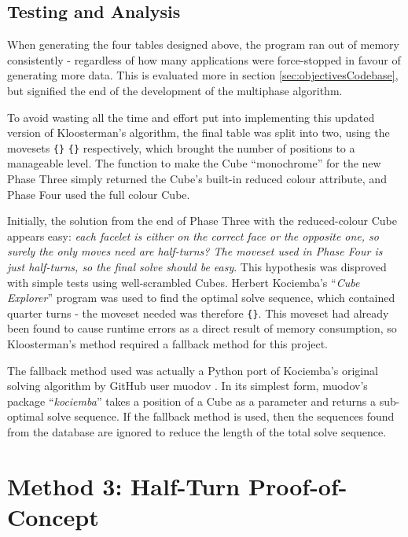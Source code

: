 \documentclass{report}
\newcommand{\tit}[1]{\textit{#1}}
\newcommand{\propernoun}[1]{\enquote{\tit{#1}}}
\newcommand{\moveset}[1]{\uppercase{\texttt{\{\formatmoves{#1}\}}}}
\begin{document}
	\subsection{Testing and Analysis}
	
	When generating the four tables designed above, the program ran out of memory consistently - regardless of how many applications were force-stopped in favour of generating more data. This is evaluated more in section \ref{sec:objectivesCodebase}, but signified the end of the development of the multiphase algorithm.
		
	To avoid wasting all the time and effort put into implementing this updated version of Kloosterman's algorithm, the final table was split into two, using the movesets \moveset{u'd'l2r2f2b"} \moveset{u2d2l2r2f2b"} respectively, which brought the number of positions to a manageable level. The function to make the Cube \enquote{monochrome} for the new Phase Three simply returned the Cube's built-in reduced colour attribute, and Phase Four used the full colour Cube.
	
	Initially, the solution from the end of Phase Three with the reduced-colour Cube appears easy: \tit{each facelet is either on the correct face or the opposite one, so surely the only moves need are half-turns? The moveset used in Phase Four is just half-turns, so the final solve should be easy}. This hypothesis was disproved with simple tests using well-scrambled Cubes. Herbert Kociemba's \propernoun{Cube Explorer} program \cite{Kociemba} was used to find the optimal solve sequence, which contained quarter turns - the moveset needed was therefore \moveset{u'd'l2r2f2b"}. This moveset had already been found to cause runtime errors as a direct result of memory consumption, so Kloosterman's method required a fallback method for this project.
	
	The fallback method used was actually a Python port of Kociemba's original solving algorithm by GitHub user muodov \cite{muodov2018}. In its simplest form, muodov's package \propernoun{kociemba} takes a position of a Cube as a parameter and returns a sub-optimal solve sequence. If the fallback method is used, then the sequences found from the database are ignored to reduce the length of the total solve sequence.
	
	\section{Method 3: Half-Turn Proof-of-Concept} \label{sec:halfTurnSolving}
	
\end{document}
